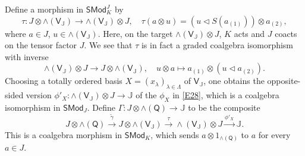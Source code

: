 \documentclass[11pt, a4paper]{amsart}
\theoremstyle{definition}
\numberwithin{equation}{section}
\begin{document}
Define a morphism in $\mathsf{SMod}_{K}^{J}$ by
\begin{equation}\label{E41b}
\tau: J \otimes \wedge(\mathsf{V}_{\mathbb{J}}) \to \wedge(\mathsf{V}_{\mathbb{J}}) \otimes J,\quad \tau(a \otimes u) = (u  \triangleleft S(a_{(1)})) \otimes a_{(2)},
\end{equation}
where $a \in J$, $u \in \wedge(\mathsf{V}_{\mathbb{J}}).$
Here, on the target $\wedge(\mathsf{V}_{\mathbb{J}}) \otimes J$, $K$ acts and $J$ coacts on the tensor factor $J$.
We see that $\tau$ is in fact a graded coalgebra isomorphism with inverse
\[ \wedge(\mathsf{V}_{\mathbb{J}})\otimes J\to  J \otimes \wedge(\mathsf{V}_{\mathbb{J}}),
\quad u \otimes a \mapsto a_{(1)} \otimes (u \triangleleft a_{(2)}). \]
Choosing a totally ordered basis $X=(x_{\lambda})_{\lambda \in \Lambda}$ of $\mathsf{V}_{\mathbb{J}}$, 
one obtains the opposite-sided version $\phi'_{X}: \wedge(\mathsf{V}_{\mathbb{J}}) \otimes J \to 
\mathbb{J}$ of the $\phi_X$ in \eqref{E28}, which is a coalgebra isomorphism in $\mathsf{SMod}_{J}$.
Define $\Gamma: J \otimes \wedge(\mathsf{Q}) \to \mathbb{J}$ to be the composite
\[ J \otimes \wedge(\mathsf{Q}) \overset{\widetilde{\gamma}}{\longrightarrow} J \otimes \wedge(\mathsf{V}_{\mathbb{J}}) \overset{\tau}{\longrightarrow} \wedge(\mathsf{V}_{\mathbb{J}}) \otimes J \xrightarrow{\phi'_{X}} \mathbb{J}. \]
This is a coalgebra morphism in $\mathsf{SMod}_{K}$, which sends $a \otimes 1_{\wedge(\mathsf{Q})}$ to $a$ for every $a \in J$.
\end{document}

